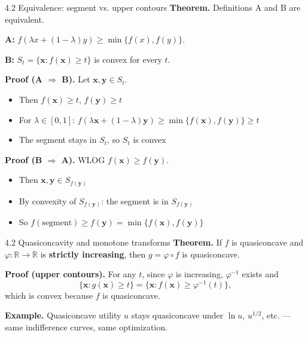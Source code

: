 \documentclass[11pt,aspectratio=169]{beamer}
\begin{document}
\begin{frame}{4.2 Equivalence: segment vs. upper contours}
  \small
  \textbf{Theorem.} Definitions A and B are equivalent.

  \textbf{A:} $f(\lambda x+(1-\lambda)y)\geq \min\{f(x),f(y)\}$.
  
  \textbf{B:} $S_t=\{\mathbf{x}: f(\mathbf{x})\geq t\}$ is convex for every $t$.
  
  \textbf{Proof (A $\Rightarrow$ B).} Let $\mathbf{x}, \mathbf{y} \in S_t$.
  
  \begin{itemize}
    \item Then $f(\mathbf{x}) \geq t$, $f(\mathbf{y}) \geq t$
    
    \item For $\lambda \in [0,1]$: $f(\lambda\mathbf{x}+(1-\lambda)\mathbf{y}) \geq \min\{f(\mathbf{x}),f(\mathbf{y})\} \geq t$
    
    \item The segment stays in $S_t$, so $S_t$ is convex
  \end{itemize}
  
  \textbf{Proof (B $\Rightarrow$ A).} WLOG $f(\mathbf{x}) \geq f(\mathbf{y})$.
  
  \begin{itemize}
    \item Then $\mathbf{x}, \mathbf{y} \in S_{f(\mathbf{y})}$
    
    \item By convexity of $S_{f(\mathbf{y})}$: the segment is in $S_{f(\mathbf{y})}$
    
    \item So $f(\text{segment}) \geq f(\mathbf{y}) = \min\{f(\mathbf{x}),f(\mathbf{y})\}$
  \end{itemize}
\end{frame}

\begin{frame}{4.2 Quasiconcavity and monotone transforms}
  \small
  \textbf{Theorem.} If $f$ is quasiconcave and $\varphi:\mathbb{R}\to\mathbb{R}$ is \textbf{strictly increasing}, then $g=\varphi\circ f$ is quasiconcave.
  
  \textbf{Proof (upper contours).} For any $t$, since $\varphi$ is increasing, $\varphi^{-1}$ exists and
  \[
    \{\mathbf{x}: g(\mathbf{x}) \geq t\}
    =
    \{\mathbf{x}: f(\mathbf{x}) \geq \varphi^{-1}(t)\},
  \]
  which is convex because $f$ is quasiconcave.
  
  \textbf{Example.} Quasiconcave utility $u$ stays quasiconcave under $\ln u$, $u^{1/2}$, etc. --- same indifference curves, same optimization.
\end{frame}
\end{document}
